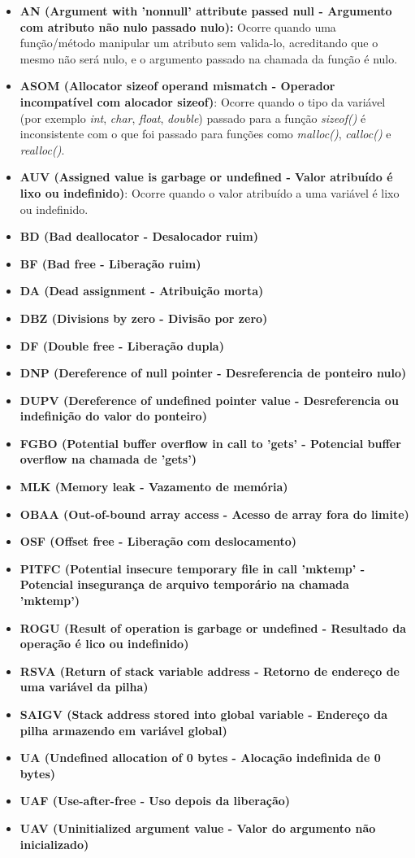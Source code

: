 \begin{itemize}
  \item \textbf{AN (Argument with 'nonnull' attribute passed null - Argumento com atributo não nulo passado nulo):} Ocorre
    quando uma função/método manipular um atributo sem valida-lo, acreditando que o mesmo não será nulo, e o argumento passado
    na chamada da função é nulo.
  \item \textbf{ASOM (Allocator sizeof operand mismatch - Operador incompatível com alocador sizeof)}: Ocorre quando o tipo
    da variável (por exemplo \textit{int}, \textit{char}, \textit{float}, \textit{double}) passado para a função 
    \textit{sizeof()} é inconsistente com o que foi passado para funções como \textit{malloc()}, \textit{calloc()} e 
    \textit{realloc()}.
  \item \textbf{AUV (Assigned value is garbage or undefined - Valor atribuído é lixo ou indefinido)}: Ocorre quando o valor 
    atribuído a uma variável é lixo ou indefinido.
  \item \textbf{BD (Bad deallocator - Desalocador ruim)}
  \item \textbf{BF (Bad free - Liberação ruim)}
  \item \textbf{DA (Dead assignment - Atribuição morta)}
  \item \textbf{DBZ (Divisions by zero - Divisão por zero)}
  \item \textbf{DF (Double free - Liberação dupla)}
  \item \textbf{DNP (Dereference of null pointer - Desreferencia de ponteiro nulo)}
  \item \textbf{DUPV (Dereference of undefined pointer value - Desreferencia ou indefinição do valor do ponteiro)}
  \item \textbf{FGBO (Potential buffer overflow in call to 'gets' - Potencial buffer overflow na chamada de 'gets')}
  \item \textbf{MLK (Memory leak - Vazamento de memória)}
  \item \textbf{OBAA (Out-of-bound array access - Acesso de array fora do limite)}
  \item \textbf{OSF (Offset free - Liberação com deslocamento)}
  \item \textbf{PITFC (Potential insecure temporary file in call 'mktemp' - Potencial insegurança de arquivo temporário na
    chamada 'mktemp')}
  \item \textbf{ROGU (Result of operation is garbage or undefined - Resultado da operação é lico ou indefinido)}
  \item \textbf{RSVA (Return of stack variable address - Retorno de endereço de uma variável da pilha)}
  \item \textbf{SAIGV (Stack address stored into global variable - Endereço da pilha armazendo em variável global)}
  \item \textbf{UA (Undefined allocation of 0 bytes - Alocação indefinida de 0 bytes)}
  \item \textbf{UAF (Use-after-free - Uso depois da liberação)}
  \item \textbf{UAV (Uninitialized argument value - Valor do argumento não inicializado)}
\end{itemize}

